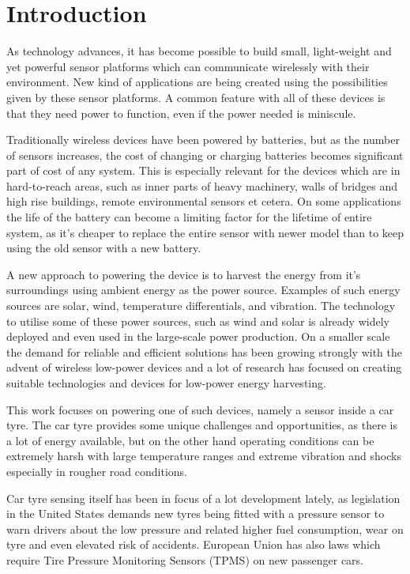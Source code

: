 \section{Introduction}

\thispagestyle{empty}

As technology advances, it has become possible to build small, light-weight and yet powerful sensor platforms which can communicate wirelessly with their environment. New kind of applications are being created using the possibilities given by these sensor platforms. A common feature with all of these devices is that they need power to function, even if the power needed is miniscule. 

Traditionally wireless devices have been powered by batteries, but as the number of sensors increases, the cost of changing or charging batteries becomes significant part of cost of any system. This is especially relevant for the devices which are in hard-to-reach areas, such as inner parts of heavy machinery, walls of bridges and high rise buildings, remote environmental sensors et cetera. On some applications the life of the battery can become a limiting factor for the lifetime of entire system, as it's cheaper to replace the entire sensor with newer model than to keep using the old sensor with a new battery. 

A new approach to powering the device is to harvest the energy from it's surroundings using ambient energy as the power source. Examples of such energy sources are solar, wind, temperature differentials, and vibration. The technology to utilise some of these power sources, such as wind and solar is already widely deployed and even used in the large-scale power production. On a smaller scale the demand for reliable and efficient solutions has been growing strongly with the advent of wireless low-power devices and a lot of research has focused on creating suitable technologies and devices for low-power energy harvesting. 

This work focuses on powering one of such devices, namely a sensor inside a car tyre. The car tyre provides some unique challenges and opportunities, as there is a lot of energy available, but on the other hand operating conditions can be extremely harsh with large temperature ranges and extreme vibration and shocks especially in rougher road conditions.

Car tyre sensing itself has been in focus of a lot development lately, as legislation in the United States demands new tyres being fitted with a pressure sensor to warn drivers about the low pressure and related higher fuel consumption, wear on tyre and even elevated risk of accidents. European Union has also laws which require Tire Pressure Monitoring Sensors (TPMS) on new passenger cars. 

